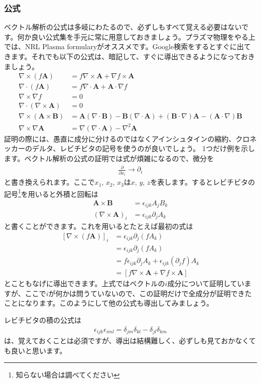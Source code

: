 \documentclass{ltjarticle}
\begin{document}
\subsubsection{公式}
ベクトル解析の公式は多岐にわたるので、必ずしもすべて覚える必要はないです。何か良い公式集を手元に常に用意しておきましょう。プラズマ物理をやる上では、NRL Plasma formularyがオススメです。Google検索をするとすぐに出てきます。それでも以下の公式は、暗記して、すぐに導出できるようになっておきましょう。
\begin{align*}
    \nabla\times(f\bm{A}) &= f\nabla\times\bm{A} + \nabla f \times \bm{A}\\
    \nabla\cdot(f\bm{A}) &= f\nabla\cdot\bm{A} + \bm{A}\cdot\nabla f\\
    \nabla\times \nabla f &= 0 \\
    \nabla \cdot \left(\nabla \times \bm{A}\right) &= 0 \\
    \nabla \times(\bm{A}\times\bm{B}) &= \bm{A}\left(\nabla\cdot\bm{B}\right) - \bm{B}\left(\nabla\cdot\bm{A}\right)
    + \left(\bm{B}\cdot\nabla\right)\bm{A} - \left(\bm{A}\cdot\nabla\right)\bm{B}\\
    \nabla\times\nabla\bm{A} &= \nabla\left(\nabla\cdot\bm{A}\right) - \nabla^2 \bm{A}
\end{align*}
証明の際には、愚直に成分に分けるのではなくアインシュタインの縮約、クロネッカーのデルタ、レビチビタの記号を使うのが良いでしょう。
1つだけ例を示します。ベクトル解析の公式の証明では式が煩雑になるので、微分を
\begin{align}
    \frac{\partial}{\partial x_i} \rightarrow \partial_i
\end{align}
と書き換えられます。ここで$x_1$, $x_2$, $x_3$は$x$, $y$, $z$を表します。するとレビチビタの記号\footnote{知らない場合は調べてください}を用いると外積と回転は
\begin{align}
    \bm{A}\times\bm{B} &= \epsilon_{ijk} A_j B_k \\
    \left(\nabla\times\bm{A}\right)_i &= \epsilon_{ijk}\partial_j A_k
\end{align}
と書くことができます。これを用いるとたとえば最初の式は
\begin{align}
    \left[\nabla\times\left(f\bm{A}\right)\right]_i &= \epsilon_{ijk}\partial_j \left(fA_k\right) \nonumber\\
    & = \epsilon_{ijk}\partial_j \left(fA_k\right) \nonumber\\
    & = f\epsilon_{ijk} \partial_j A_k + \epsilon_{ijk}\left(\partial_j f\right) A_k \nonumber\\
    & = \left[f\nabla\times \bm{A} + \nabla f \times \bm{A}\right]
\end{align}
とこともなげに導出できます。上式ではベクトルの$i$成分について証明していますが、ここで$i$が何かは問うていないので、この証明だけで全成分が証明できたことになります。このようにして他の公式も導出してみましょう。
\par
レビチビタの積の公式は
\begin{align}
    \epsilon_{ijk}\epsilon_{iml} = \delta_{jm}\delta_{kl} - \delta_{jl}\delta_{km}
\end{align}
は、覚えておくことは必須ですが、導出は結構難しく、必ずしも見ておかなくても良いと思います。
\end{document}
